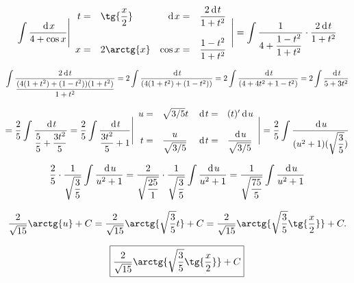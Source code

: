 {}

$$
  \int \dfrac{\d{x}}{4+\cos{x}}
  \Bigg|
    \begin{array}{rl rl}
      t = & \tg{\dfrac{x}{2}}  & \d{x}= & \dfrac{2\d{t}}{1+t^2} \\
      \\
      x = & 2\arctg{x} & \cos{x} = & \dfrac{1-t^2}{1+t^2}
    \end{array}
  \Bigg| = \int \dfrac{1}{4+\dfrac{1-t^2}{1+t^2}} \cdot \dfrac{2\d{t}}{1+t^2}
$$

$$
  \int \dfrac{2\hspace{2pt}\text{d}\hspace{1pt}{t}}{\dfrac{(4(1+t^2)+(1-t^2))(1+t^2)}{1+t^2}}
= 2 \int \dfrac{\hspace{2pt}\text{d}\hspace{1pt}{t}}{(4(1+t^2)+(1-t^2))}
= 2 \int \dfrac{\hspace{2pt}\text{d}\hspace{1pt}{t}}{(4+4t^2+1-t^2)}
= 2 \int \dfrac{\hspace{2pt}\text{d}\hspace{1pt}{t}}{5+3t^2}
$$

$$
= \dfrac{2}{5} \int \dfrac{\hspace{2pt}\text{d}\hspace{1pt}{t}}{\dfrac{5}{5}+\dfrac{3t^2}{5}}
= \dfrac{2}{5} \int \dfrac{\hspace{2pt}\text{d}\hspace{1pt}{t}}{\dfrac{3t^2}{5}+1} \Bigg|
    \begin{array}{rl rl}
      u = & \sqrt{3/5} t          &  \hspace{2pt}\text{d}\hspace{1pt}{t} = & (t)'\hspace{2pt}\text{d}\hspace{1pt}{u} \\
      \\
      t = & \dfrac{u}{\sqrt{3/5}} &  \hspace{2pt}\text{d}\hspace{1pt}{t} = & \dfrac{\hspace{2pt}\text{d}\hspace{1pt}{u}}{ \sqrt{3/5} } \\
    \end{array}
  \Bigg| = \dfrac{2}{5} \int \dfrac{\hspace{2pt}\text{d}\hspace{1pt}{u}}{(u^2+1)(\sqrt{\dfrac{3}{5}})}
$$

$$
  \dfrac{2}{5} \cdot \dfrac{1}{\sqrt{\dfrac{3}{5}}} \int \dfrac{\hspace{2pt}\text{d}\hspace{1pt}{u}}{u^2+1}
= \dfrac{2}{\sqrt{\dfrac{25}{1}}} \cdot \dfrac{1}{\sqrt{\dfrac{3}{5}}} \int \dfrac{\hspace{2pt}\text{d}\hspace{1pt}{u}}{u^2+1}
= \dfrac{1}{\sqrt{\dfrac{75}{5}}} \int \dfrac{\hspace{2pt}\text{d}\hspace{1pt}{u}}{u^2+1}
$$

$$
  \dfrac{2}{\sqrt{15}}\arctg{u} + C
= \dfrac{2}{\sqrt{15}}\arctg{\sqrt{\dfrac{3}{5}}t} + C
= \dfrac{2}{\sqrt{15}}\arctg{\sqrt{\dfrac{3}{5}} \tg{\dfrac{x}{2}}} + C.
$$

$$
\boxed{\dfrac{2}{\sqrt{15}}\arctg{\sqrt{\dfrac{3}{5}} \tg{\dfrac{x}{2}}} + C}
$$
